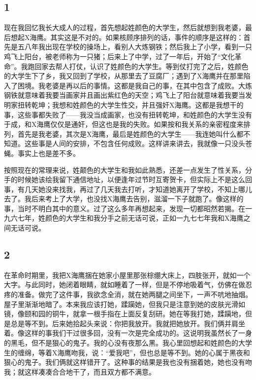 \subsection{1}

现在我回忆我长大成人的过程，首先想起姓颜色的大学生，然后就想到我老婆，最后想起X海鹰。其实这是不对的。如果核顾序排列的话，事件的顺序是这样的：首先是五八年我出现在学校的操场上，看别人大炼钢铁；然后我上了小学，看到一只鸡飞上阳台，被老师称为一只猪；后来上了中学，过了一年后，开始了“文化革命”。我跑回家去帮人打仗，认识了姓颜色的大学生。等到仗打完了之后，姓颜色的大学生下了乡，我又回到了学校，从那里去了豆腐厂；遇到了X海鹰并在那里陷入了困境。我老婆是再以后的事情。这都是我自己的事，在其中包含了成败。大炼钢铁就意味着我要当画家并且画出紫红色的天空；鸡飞上了阳台就意味着我要当发明家扭转乾坤；我想和姓颜色的大学生性交，并且强奸X海鹰。这都是我想干的事，这些事都失败了——我没当成画家，也没有扭转乾坤，和姓颜色的大学生没有于成，和X海鹰仅仅是通奸，但这也是我的失败。如果按和我关系的亲密程度来排列，首先是我老婆，其次是X海鹰，最后是姓颜色的大学生——我连她叫什么都不知道。这些事是人间的安排，不包含任何成败。这样讲来讲去，我就像一只没头苍蝇。事实上也是差不多。 

按照现在的常理来说，姓颠色的大学生和我如此熟悉，还差一点发生了性关系，分手的时候她该绘我留下通信地址，以便逢年过节时互寄贺卡，但实际上不是这么回事，有几天她没来找我，再过了几天我去打听，才知道她离开了学校，不知上哪儿去了。我后来考上了大学，也没找X海鹰去告别，滋溜一下子就跑了。像这样的事，当时不明白其中的意义。过了这么多年再想起来，发现一切都昭然若揭。在一九六七年，姓颜色的大学生和我分手之前无话可说，正如一九七七年我和X海鹰之间无话可说。 

\subsection{2} 

在革命时期里，我把X海鹰捆在她家小屋里那张棕绷大床上，四肢张开，就如一个大字。与此同时，她闭着眼睛，就如睡着了一样，但是不停地吸着气，仿佛在做忍疼的准备。做完了这件事，我欲念全消，就在她两腿之间坐下，一声不吭地抽烟。屋子里渐渐地暗了。本来我应该打她，蹂躏她，但我只是注意到她的皮肤光滑如镜，像颐和园的铜牛，就拿一根手指在上面反复刮研。她在等我打她，蹂躏地，但是总是等不到。后来她拾起头来说：你把我放开。我就把她放开。我们俩并肩坐着。像这样的事我们干过很多回，没有一次是完全成功的。这说明我虽然长了一身的黑毛，但不是狠心的鬼子。我的心没有夜那么黑。我心里回想起和姓颜色的大学生的缠绵，等着X海鹰吻我，说：“爱我吧”，但也总是等不到。她的心属于黑夜和狠心的鬼子。我们俩就这样错开了。这种事的结果是我也没有捆着她，她也没有吻我；就这样凑凑合合地干了，而且双方都不满意。 

